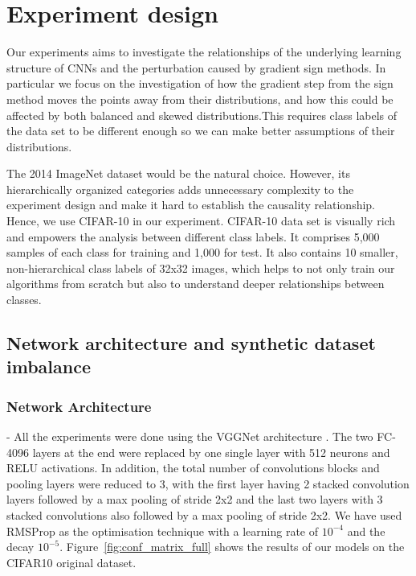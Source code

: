 \documentclass[runningheads,a4paper]{llncs}
\begin{document}
\section{Experiment design}

Our experiments aims to investigate the relationships of the underlying learning structure of CNNs and the perturbation caused by gradient sign methods. In particular we focus on the investigation of how the gradient step from the sign method moves the points away from their distributions, and how this could be affected by both balanced and skewed distributions.This requires  class labels of the data set to be different enough so we can make better assumptions of their distributions. 

The 2014 ImageNet dataset \cite{deng2009imagenet} would be the natural choice. However, its hierarchically organized categories adds unnecessary complexity to the experiment design and make it hard to establish the causality relationship. Hence, we use  CIFAR-10 in our experiment. CIFAR-10 data set is visually rich and empowers the analysis between different class labels. It comprises 5,000 samples of each class for training and 1,000 for test. It also contains 10 smaller, non-hierarchical class labels of 32x32 images, which helps to not only train our algorithms from scratch but also to understand deeper relationships between classes.
\subsection{Network architecture and synthetic dataset imbalance}

\subsubsection{Network Architecture} - All the experiments were done using the VGGNet architecture \cite{simonyan2014very}. The two FC-4096 layers at the end were replaced by one single layer with 512 neurons and RELU activations. In addition, the total number of convolutions blocks and pooling layers were reduced to 3, with the first layer having 2 stacked convolution layers followed by a max pooling of stride 2x2 and the last two layers with 3 stacked convolutions also followed by a max pooling of stride 2x2. We have used RMSProp  \cite{bengiormsprop} as the optimisation technique with a learning rate of $10^{-4}$ and the decay $10^{-5}$. Figure~\ref{fig:conf_matrix_full} shows the results of our models on the CIFAR10 original dataset.
\end{document}
